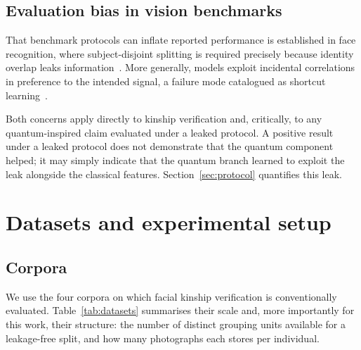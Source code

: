 \documentclass[preprint,12pt]{elsarticle}
\begin{document}
\subsection{Evaluation bias in vision benchmarks}

That benchmark protocols can inflate reported performance is established in
face recognition, where subject-disjoint splitting is required precisely
because identity overlap leaks
information~\cite{kemelmacher2016megaface}. More generally, models exploit
incidental correlations in preference to the intended signal, a failure mode
catalogued as shortcut learning~\cite{geirhos2020shortcut}.

Both concerns apply directly to kinship verification and, critically, to any
quantum-inspired claim evaluated under a leaked protocol. A positive result
under a leaked protocol does not demonstrate that the quantum component
helped; it may simply indicate that the quantum branch learned to exploit the
leak alongside the classical features. Section~\ref{sec:protocol} quantifies
this leak.

\section{Datasets and experimental setup}
\label{sec:data}

\subsection{Corpora}

We use the four corpora on which facial kinship verification is conventionally
evaluated. Table~\ref{tab:datasets} summarises their scale and, more
importantly for this work, their structure: the number of distinct grouping
units available for a leakage-free split, and how many photographs each stores
per individual.

\begin{table}[t]
\centering
\caption{The four benchmark corpora, characterised by the properties that
govern how they can be split and how much evidence they supply per person.
Photographs per identity is the property that determines whether set-level
aggregation is possible at all.}
\label{tab:datasets}
\end{table}
\end{document}
